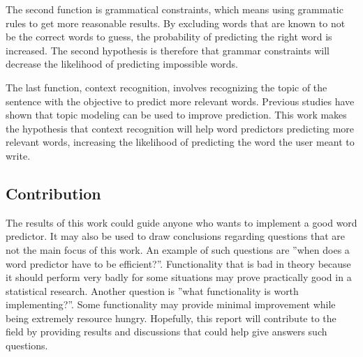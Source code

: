 The second function is grammatical constraints, which means using grammatic rules to get more reasonable results. By excluding words that are known to not be the correct words to guess, the probability of predicting the right word is increased. The second hypothesis is therefore that grammar constraints will decrease the likelihood of predicting impossible words.

The last function, context recognition, involves recognizing the topic of the sentence with the objective to predict more relevant words. Previous studies have shown that topic modeling can be used to improve prediction\cite{DBLP:journals/corr/cs-CL-0009027}\cite{keystrokes}. This work makes the hypothesis that context recognition will help word predictors predicting more relevant words, increasing the likelihood of predicting the word the user meant to write.

\subsection{Contribution}
The results of this work could guide anyone who wants to implement a good word predictor. It may also be used to draw conclusions regarding questions that are not the main focus of this work. An example of such questions are ''when does a word predictor have to be efficient?''. Functionality that is bad in theory because it should perform very badly for some situations may prove practically good in a statistical research. Another question is ''what functionality is worth implementing?''. Some functionality may provide minimal improvement while being extremely resource hungry. Hopefully, this report will contribute to the field by providing results and discussions that could help give answers such questions.